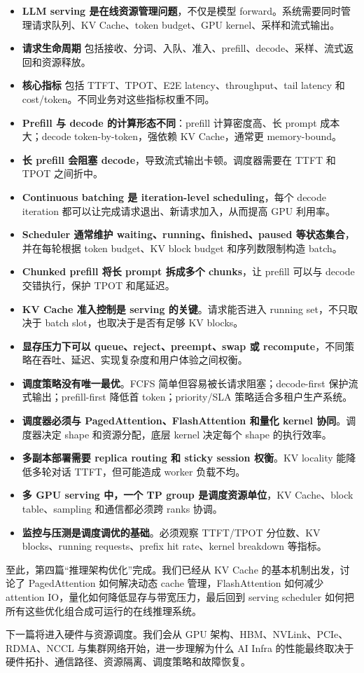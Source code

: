 \begin{itemize}
\item \textbf{LLM serving 是在线资源管理问题}，不仅是模型 forward。系统需要同时管理请求队列、KV Cache、token budget、GPU kernel、采样和流式输出。
\item \textbf{请求生命周期} 包括接收、分词、入队、准入、prefill、decode、采样、流式返回和资源释放。
\item \textbf{核心指标} 包括 TTFT、TPOT、E2E latency、throughput、tail latency 和 cost/token。不同业务对这些指标权重不同。
\item \textbf{Prefill 与 decode 的计算形态不同}：prefill 计算密度高、长 prompt 成本大；decode token-by-token，强依赖 KV Cache，通常更 memory-bound。
\item \textbf{长 prefill 会阻塞 decode}，导致流式输出卡顿。调度器需要在 TTFT 和 TPOT 之间折中。
\item \textbf{Continuous batching 是 iteration-level scheduling}，每个 decode iteration 都可以让完成请求退出、新请求加入，从而提高 GPU 利用率。
\item \textbf{Scheduler 通常维护 waiting、running、finished、paused 等状态集合}，并在每轮根据 token budget、KV block budget 和序列数限制构造 batch。
\item \textbf{Chunked prefill 将长 prompt 拆成多个 chunks}，让 prefill 可以与 decode 交错执行，保护 TPOT 和尾延迟。
\item \textbf{KV Cache 准入控制是 serving 的关键}。请求能否进入 running set，不只取决于 batch slot，也取决于是否有足够 KV blocks。
\item \textbf{显存压力下可以 queue、reject、preempt、swap 或 recompute}，不同策略在吞吐、延迟、实现复杂度和用户体验之间权衡。
\item \textbf{调度策略没有唯一最优}。FCFS 简单但容易被长请求阻塞；decode-first 保护流式输出；prefill-first 降低首 token；priority/SLA 策略适合多租户生产系统。
\item \textbf{调度器必须与 PagedAttention、FlashAttention 和量化 kernel 协同}。调度器决定 shape 和资源分配，底层 kernel 决定每个 shape 的执行效率。
\item \textbf{多副本部署需要 replica routing 和 sticky session 权衡}。KV locality 能降低多轮对话 TTFT，但可能造成 worker 负载不均。
\item \textbf{多 GPU serving 中，一个 TP group 是调度资源单位}，KV Cache、block table、sampling 和通信都必须跨 ranks 协调。
\item \textbf{监控与压测是调度调优的基础}。必须观察 TTFT/TPOT 分位数、KV blocks、running requests、prefix hit rate、kernel breakdown 等指标。
\end{itemize}

至此，第四篇“推理架构优化”完成。我们已经从 KV Cache 的基本机制出发，讨论了 PagedAttention 如何解决动态 cache 管理，FlashAttention 如何减少 attention IO，量化如何降低显存与带宽压力，最后回到 serving scheduler 如何把所有这些优化组合成可运行的在线推理系统。

下一篇将进入硬件与资源调度。我们会从 GPU 架构、HBM、NVLink、PCIe、RDMA、NCCL 与集群网络开始，进一步理解为什么 AI Infra 的性能最终取决于硬件拓扑、通信路径、资源隔离、调度策略和故障恢复。
